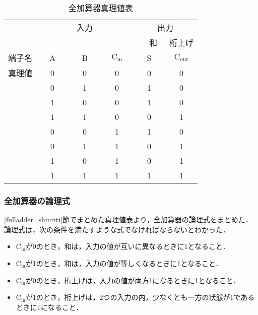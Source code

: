 \begin {table}[ht]
	\begin {center}
		\caption {全加算器真理値表}%
		\begin {tabular}{c|ccc|cc}\hline
			\multicolumn{1}{c|}{}&%
			\multicolumn{3}{c}{入力}&%
			\multicolumn{2}{|c}{出力}\\ %
			\multicolumn{1}{c|}{}&
			\multicolumn{1}{c}{　　　}&
			\multicolumn{1}{c}{　　　}&
			\multicolumn{1}{c}{　　　}&
			\multicolumn{1}{|c}{　和　}&
			\multicolumn{1}{c}{桁上げ}\\
			\hline
			\multicolumn{1}{c|}{端子名}&%
			\multicolumn{1}{c}{A}&%
			\multicolumn{1}{c}{B}&%
			\multicolumn{1}{c}{$\mathrm{C_{in}}$}&%
			\multicolumn{1}{|c}{S}&%
			\multicolumn{1}{c}{$\mathrm{C_{out}}$}\\%
			\hline
			真理値
			&	0	&	0	&	0	&	0	&	0	\\
			&	0	&	1	&	0	&	1	&	0	\\
			&	1	&	0	&	0	&	1	&	0	\\
			&	1	&	1	&	0	&	0	&	1	\\
			&	0	&	0	&	1	&	1	&	0	\\
			&	0	&	1	&	1	&	0	&	1	\\
			&	1	&	0	&	1	&	0	&	1	\\
			&	1	&	1	&	1	&	1	&	1	\\
			\hline
		\end{tabular}
		\label {tab:fulladder_shinrititab}%
	\end{center}
\end{table}

%
%
\subsubsection{全加算器の論理式}
\label{fulladder_ronrishiki}
\ref{fulladder_shinriti}節でまとめた真理値表より，全加算器の論理式をまとめた．論理式は，次の条件を満たすような式でなければならないとわかった．

\begin{itemize}
	\item $\mathrm{C_{in}}$が0のとき，和は，入力の値が互いに異なるときに1となること．
	\item $\mathrm{C_{in}}$が1のとき，和は，入力の値が等しくなるときに1となること．
	\item $\mathrm{C_{in}}$が0のとき，桁上げは，入力の値が両方1になるときに1となること．
	\item $\mathrm{C_{in}}$が1のとき，桁上げは，2つの入力の内，少なくとも一方の状態が1であるときに1になること．
\end{itemize}


